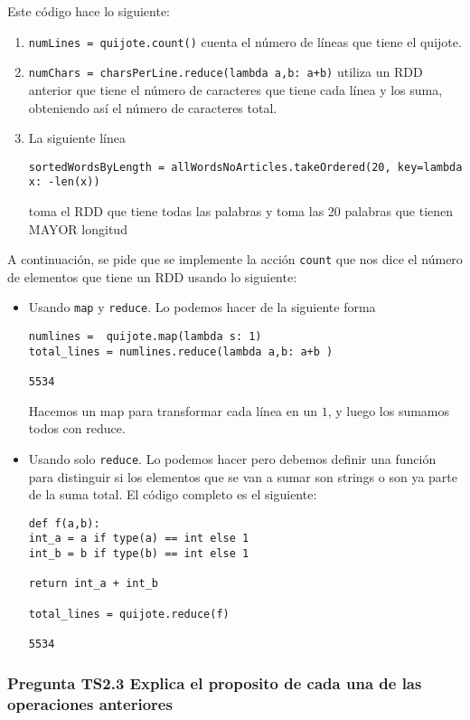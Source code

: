 \documentclass[11pt]{article}
\def\inline{\lstinline[basicstyle=\ttfamily,keywordstyle={}]}
\begin{document}
Este código hace lo siguiente:

\begin{enumerate}
	\item \inline{numLines = quijote.count()} cuenta el número de líneas que tiene el quijote.
	
	\item \inline{numChars = charsPerLine.reduce(lambda a,b: a+b)} utiliza un RDD anterior que
	tiene el número de caracteres que tiene cada línea y los suma, obteniendo así el número de caracteres total.
	
	\item La siguiente línea
	\begin{verbatim}
sortedWordsByLength = allWordsNoArticles.takeOrdered(20, key=lambda x: -len(x))
	\end{verbatim} 
	toma el RDD que tiene todas las palabras y toma las 20 palabras que tienen MAYOR longitud
\end{enumerate}

A continuación, se pide que se implemente la acción \inline{count} que nos dice el número de elementos que tiene un RDD usando lo siguiente:
\begin{itemize}
	\item Usando \inline{map} y \inline{reduce}. Lo podemos hacer de la siguiente forma
	\begin{verbatim}
numlines =  quijote.map(lambda s: 1)
total_lines = numlines.reduce(lambda a,b: a+b )

5534
	\end{verbatim}
	
	Hacemos un map para transformar cada línea en un $1$, y luego los sumamos todos con reduce.
	
	\item Usando solo \inline{reduce}. Lo podemos hacer pero debemos definir una función para distinguir si los elementos que se van a sumar son strings o son ya parte de la suma total. El código completo es el siguiente:
	\begin{verbatim}
def f(a,b):
int_a = a if type(a) == int else 1
int_b = b if type(b) == int else 1

return int_a + int_b

total_lines = quijote.reduce(f)

5534
	\end{verbatim}

\end{itemize}

\subsubsection*{ Pregunta TS2.3 Explica el proposito de cada una de las operaciones anteriores}
\end{document}
